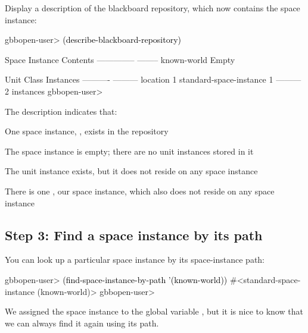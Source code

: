 \documentclass[10pt,twoside,english,pdftex]{article}
\begin{document}
%
%
%
Display a description of the blackboard repository, which now contains the
 space instance:
%
\W\supp
\begin{example}
\textcolor{darkergray}{%
  gbbopen-user> \textcolor{black}{(describe-blackboard-repository)}
  
  Space Instance                Contents
  --------------                --------
  known-world                   Empty

  Unit Class                    Instances
  ----------                    ---------
  location                              1
  standard-space-instance               1
                                ---------
                                        2 instances
  gbbopen-user>}
\end{example}

The description indicates that:
\begin{tightitemize}
\item One space instance, , exists in the repository
\item The  space instance is empty; there are no unit
  instances stored in it
\item The  unit instance exists, but it does not reside
  on any space instance
\item There is one , our
   space instance, which also does not reside
  on any space instance
\end{tightitemize}
 
\subsection*{Step 3: Find a space instance by its path}

%
%
%
You can look up a particular space instance by its space-instance path:
%
\W\supp
\begin{example}
\textcolor{darkergray}{%
  gbbopen-user> \textcolor{black}{(find-space-instance-by-path '(known-world))}
  #<standard-space-instance (known-world)>
  gbbopen-user>}
\end{example}

We assigned the  space instance to the global variable
, but it is nice to know that we can always find it again using its
path.
\end{document}
